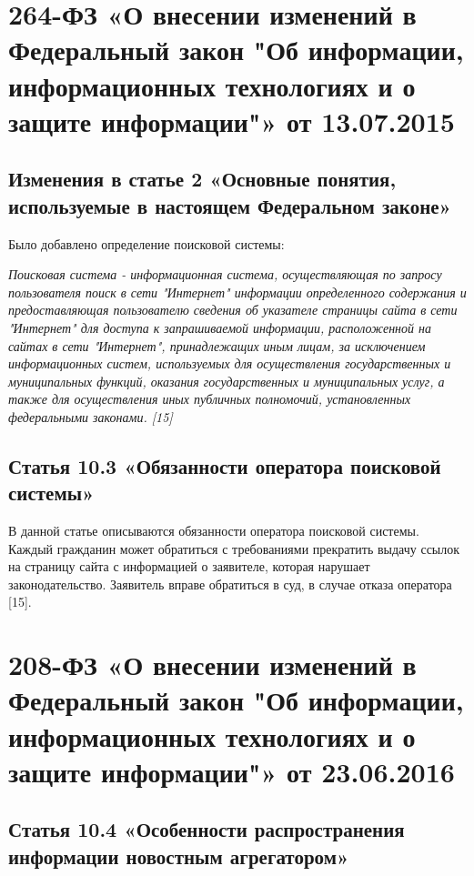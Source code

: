 \documentclass[14pt,a4paper,report]{article}
\begin{document}
\section{264-ФЗ «О внесении изменений в Федеральный закон "Об информации, информационных технологиях и о защите информации"» от 13.07.2015}

\subsection{Изменения в статье 2 «Основные понятия, используемые в настоящем Федеральном законе»}

Было добавлено определение поисковой системы:

\begin{displayquote}
	\emph{Поисковая система - информационная система, осуществляющая по запросу пользователя поиск в сети "Интернет" информации определенного содержания и предоставляющая пользователю сведения об указателе страницы сайта в сети "Интернет" для доступа к запрашиваемой информации, расположенной на сайтах в сети "Интернет", принадлежащих иным лицам, за исключением информационных систем, используемых для осуществления государственных и муниципальных функций, оказания государственных и муниципальных услуг, а также для осуществления иных публичных полномочий, установленных федеральными законами. [15]}
\end{displayquote}

\subsection{Статья 10.3 «Обязанности оператора поисковой системы»}

В данной статье описываются обязанности оператора поисковой системы. Каждый гражданин может обратиться с требованиями прекратить выдачу ссылок на страницу сайта с информацией о заявителе, которая нарушает законодательство. Заявитель вправе обратиться в суд, в случае отказа оператора [15].

\section{208-ФЗ «О внесении изменений в Федеральный закон "Об информации, информационных технологиях и о защите информации"» от 23.06.2016}

\subsection{Статья 10.4 «Особенности распространения информации новостным агрегатором»}
\end{document}
